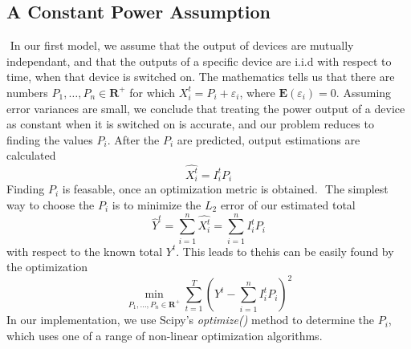 \documentclass{article}
\begin{document}
\subsection{A Constant Power Assumption}
​
In our first model, we assume that the output of devices are mutually independant, and that the outputs of a specific device are i.i.d with respect to time, when that device is switched on. The mathematics tells us that there are numbers $P_1, \dots, P_n \in \mathbf{R}^+$ for which $X_i^t = P_i + \varepsilon_i$, where $\mathbf{E}(\varepsilon_i) = 0$. Assuming error variances are small, we conclude that treating the power output of a device as constant when it is switched on is accurate, and our problem reduces to finding the values $P_i$. After the $P_i$ are predicted, output estimations are calculated
%
\[ \hat{X_i^t} = I_i^t P_i \]
%
Finding $P_i$ is feasable, once an optimization metric is obtained.
​
The simplest way to choose the $P_i$ is to minimize the $L_2$ error of our estimated total
%
\[ \hat{Y}^t = \sum_{i = 1}^n \hat{X_i^t} = \sum_{i = 1}^n I_i^t P_i \]
%
with respect to the known total $Y^t$. This leads to thehis can be easily found by the optimization
%
\[ \min_{P_1, \dots, P_n \in \mathbf{R}^+} \sum_{t = 1}^T \left( Y^t - \sum_{i = 1}^n I_i^t P_i \right)^2 \]
%
In our implementation, we use Scipy's {\it optimize()} method to determine the $P_i$, which uses one of a range of non-linear optimization algorithms.
​
\end{document}
